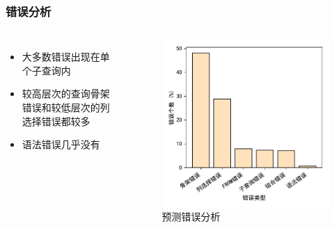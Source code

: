 \documentclass{ctexbeamer}
\begin{document}
\begin{frame}
  \frametitle{错误分析}
  \begin{columns}
    \begin{itemize}
      \item 大多数错误出现在单个子查询内
      \item 较高层次的查询骨架错误和较低层次的列选择错误都较多
      \item 语法错误几乎没有
    \end{itemize}
    \begin{figure}
      \includegraphics[height=0.7\textheight]{figure/error.pdf}
      \caption{预测错误分析}
    \end{figure}
  \end{columns}
\end{frame}
\end{document}
